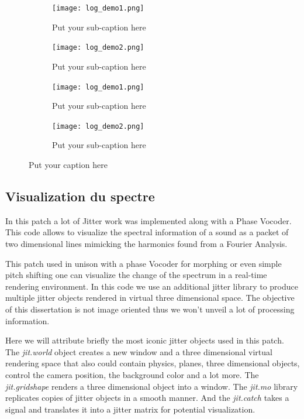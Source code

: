 \begin{figure}
\begin{subfigure}{.5\textwidth}
  \centering
  \texttt{[image: log\_demo1.png]}  
  \caption{Put your sub-caption here}
  \label{fig:sub-first}
\end{subfigure}
\begin{subfigure}{.5\textwidth}
  \centering
  \texttt{[image: log\_demo2.png]}  
  \caption{Put your sub-caption here}
  \label{fig:sub-second}
\end{subfigure}

\newline

\begin{subfigure}{.5\textwidth}
  \centering
  \texttt{[image: log\_demo1.png]}  
  \caption{Put your sub-caption here}
  \label{fig:sub-third}
\end{subfigure}
\begin{subfigure}{.5\textwidth}
  \centering
  \texttt{[image: log\_demo2.png]}  
  \caption{Put your sub-caption here}
  \label{fig:sub-fourth}
\end{subfigure}
\caption{Put your caption here}
\label{fig:fig}
\end{figure}

\subsection{Visualization du spectre}
    
    In this patch a lot of Jitter work was implemented along with a Phase Vocoder. This code allows to visualize the spectral information of a sound as a packet of two dimensional lines mimicking the harmonics found from a Fourier Analysis.

    This patch used in unison with a phase Vocoder for morphing or even simple pitch shifting one can visualize the change of the spectrum in a real-time rendering environment. In this code we use an additional jitter library to produce multiple jitter objects rendered in virtual three dimensional space. The objective of this dissertation is not image oriented thus we won't unveil a lot of processing information.

    Here we will attribute briefly the most iconic jitter objects used in this patch. The \textit{jit.world} object creates a new window and a three dimensional virtual rendering space that also could contain physics, planes, three dimensional objects, control the camera position, the background color and a lot more. The \textit{jit.gridshape} renders a three dimensional object into a window. The \textit{jit.mo} library replicates copies of jitter objects in a smooth manner. And the \textit{jit.catch} takes a signal and translates it into a jitter matrix for potential visualization.

